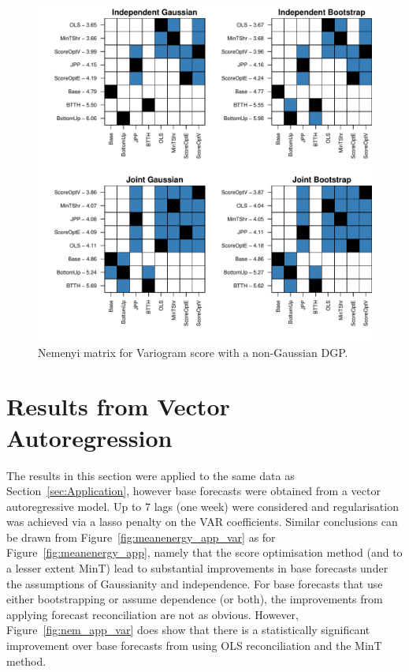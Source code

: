 \documentclass[a4paper,12pt]{article}
\theoremstyle{definition}
\begin{document}
\begin{figure}[!htb]
	\centering
	\includegraphics[height=.4\textheight]{nsv.pdf}
	\caption{Nemenyi matrix for Variogram score with a non-Gaussian DGP.}
	\label{fig:nsv}
\end{figure}

\clearpage

\section{Results from Vector Autoregression}\label{app:var}

The results in this section were applied to the same data as Section~\ref{sec:Application}, however base forecasts were obtained from a vector autoregressive model.  Up to 7 lags (one week) were considered and regularisation was achieved via a lasso penalty on the VAR coefficients.  Similar conclusions can be drawn from Figure~\ref{fig:meanenergy_app_var} as for Figure~\ref{fig:meanenergy_app}, namely that the score optimisation method (and to a lesser extent MinT) lead to substantial improvements in base forecasts under the assumptions of Gaussianity and independence.  For base forecasts that use either bootstrapping or assume dependence (or both), the improvements from applying forecast reconciliation are not as obvious.  However, Figure~\ref{fig:nem_app_var} does show that there is a statistically significant improvement over base forecasts from using OLS reconciliation and the MinT method.
\end{document}
